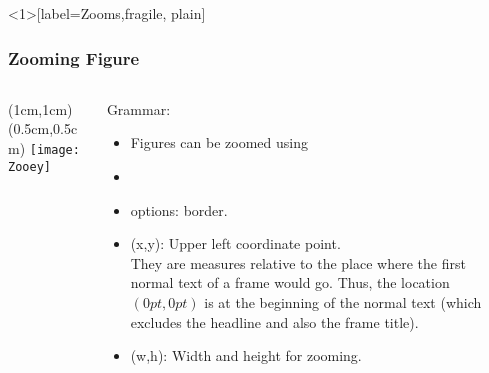 \begin{frame}<1>[label=Zooms,fragile, plain]
\frametitle<1>{Zooming Figure}
  \begin{columns}[T]
    \begin{column}{.3\textwidth}
      (1cm,1cm)(0.5cm,0.5cm)
      \texttt{[image: Zooey]} %
    \end{column}

    \begin{column}{.7\textwidth}
      Grammar:
      \begin{itemize}
        \item Figures can be zoomed using
        \item \alert{}
        \item options: border.
        \item (x,y): Upper left coordinate point.\\
        They are measures relative to the place where the first normal text of a frame would go.
        Thus, the location $(0pt,0pt)$ is at the beginning of the normal text (which excludes
        the headline and also the frame title).
        \item (w,h): Width and height for zooming.
      \end{itemize}
    \end{column}
  \end{columns}

\end{frame}
